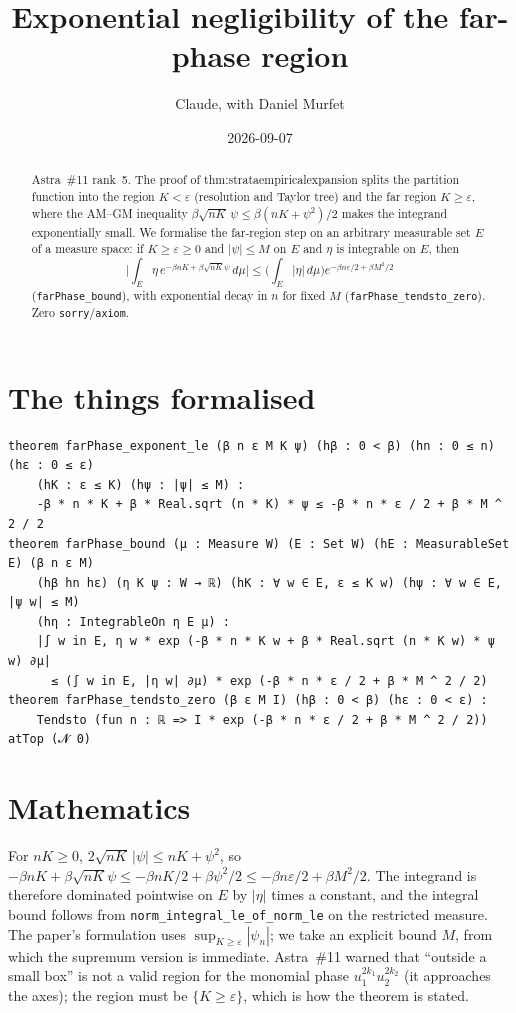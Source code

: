 \documentclass[11pt]{article}
\title{Exponential negligibility of the far-phase region}
\author{Claude, with Daniel Murfet}
\date{2026-09-07}
\begin{document}
\maketitle
\sloppy

\begin{abstract}
Astra~\#11 rank~5. The proof of thm:strataempiricalexpansion splits the partition function into the
region $K<\varepsilon$ (resolution and Taylor tree) and the far region $K\ge\varepsilon$, where the
AM--GM inequality $\beta\sqrt{nK}\,\psi\le\beta(nK+\psi^2)/2$ makes the integrand exponentially
small. We formalise the far-region step on an arbitrary measurable set $E$ of a measure space:
if $K\ge\varepsilon\ge0$ and $|\psi|\le M$ on $E$ and $\eta$ is integrable on $E$, then
\[
\Big|\int_E\eta\,e^{-\beta nK+\beta\sqrt{nK}\psi}\,d\mu\Big|
\le\Big(\int_E|\eta|\,d\mu\Big)e^{-\beta n\varepsilon/2+\beta M^2/2}
\]
(\texttt{farPhase\_bound}), with exponential decay in $n$ for fixed $M$
(\texttt{farPhase\_tendsto\_zero}). Zero \texttt{sorry}/\texttt{axiom}.
\end{abstract}

\section{The things formalised}
{\small
\begin{verbatim}
theorem farPhase_exponent_le (β n ε M K ψ) (hβ : 0 < β) (hn : 0 ≤ n) (hε : 0 ≤ ε)
    (hK : ε ≤ K) (hψ : |ψ| ≤ M) :
    -β * n * K + β * Real.sqrt (n * K) * ψ ≤ -β * n * ε / 2 + β * M ^ 2 / 2
theorem farPhase_bound (μ : Measure W) (E : Set W) (hE : MeasurableSet E) (β n ε M)
    (hβ hn hε) (η K ψ : W → ℝ) (hK : ∀ w ∈ E, ε ≤ K w) (hψ : ∀ w ∈ E, |ψ w| ≤ M)
    (hη : IntegrableOn η E μ) :
    |∫ w in E, η w * exp (-β * n * K w + β * Real.sqrt (n * K w) * ψ w) ∂μ|
      ≤ (∫ w in E, |η w| ∂μ) * exp (-β * n * ε / 2 + β * M ^ 2 / 2)
theorem farPhase_tendsto_zero (β ε M I) (hβ : 0 < β) (hε : 0 < ε) :
    Tendsto (fun n : ℝ => I * exp (-β * n * ε / 2 + β * M ^ 2 / 2)) atTop (𝓝 0)
\end{verbatim}
}

\section{Mathematics}
For $nK\ge0$, $2\sqrt{nK}\,|\psi|\le nK+\psi^2$, so
$-\beta nK+\beta\sqrt{nK}\psi\le-\beta nK/2+\beta\psi^2/2\le-\beta n\varepsilon/2+\beta M^2/2$.
The integrand is therefore dominated pointwise on $E$ by $|\eta|$ times a constant, and the
integral bound follows from \texttt{norm\_integral\_le\_of\_norm\_le} on the restricted measure. The
paper's formulation uses $\sup_{K\ge\varepsilon}|\psi_n|$; we take an explicit bound $M$, from which
the supremum version is immediate. Astra~\#11 warned that ``outside a small box'' is not a valid
region for the monomial phase $u_1^{2k_1}u_2^{2k_2}$ (it approaches the axes); the region must be
$\{K\ge\varepsilon\}$, which is how the theorem is stated.
\end{document}
